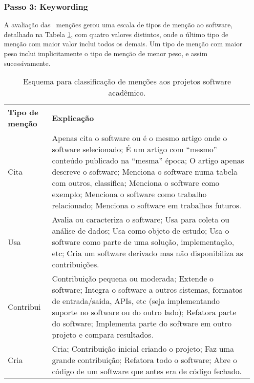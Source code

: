 
\subsubsection{Passo 3: Keywording}

A avaliação das \ScreeningCount \ menções gerou uma escala de tipos de menção
ao software, detalhado na Tabela \ref{esquema-de-mencao}, com quatro valores
distintos, onde o último tipo de menção com maior valor inclui todos os demais.
Um tipo de menção com maior peso inclui implicitamente o tipo de menção de
menor peso, e assim sucessivamente.

\begin{table}[h]
\caption{Esquema para classificação de menções aos projetos software acadêmico.}
\centering
\begin{tabular}{ l p{10cm} }
  \hline
  Tipo de menção           & Explicação \\
  \hline
  Cita      & Apenas cita o software ou é o mesmo artigo onde o software selecionado; É um artigo com ``mesmo'' conteúdo publicado na ``mesma'' época; O artigo apenas descreve o software; Menciona o software numa tabela com outros, classifica; Menciona o software como exemplo; Menciona o software como trabalho relacionado; Menciona o software em trabalhos futuros. \\
  Usa       & Avalia ou caracteriza o software; Usa para coleta ou análise de dados; Usa como objeto de estudo; Usa o software como parte de uma solução, implementação, etc; Cria um software derivado mas não disponibiliza as contribuições. \\
  Contribui & Contribuição pequena ou moderada; Extende o software; Integra o software a outros sistemas, formatos de entrada/saída, APIs, etc (seja implementando suporte no software ou do outro lado); Refatora parte do software; Implementa parte do software em outro projeto e compara resultados. \\
  Cria      & Cria; Contribuição inicial criando o projeto; Faz uma grande contribuição; Refatora todo o software; Abre o código de um software que antes era de código fechado. \\
  \hline
\end{tabular}
\label{esquema-de-mencao}
\end{table}


